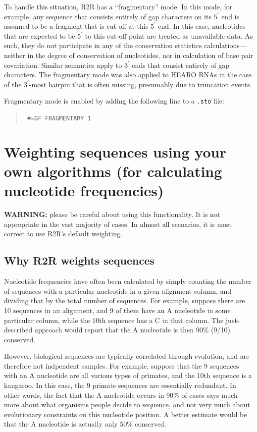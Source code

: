 \documentclass[letterpaper,12pt]{report}
\newcommand{\example}[1]{
\begin{quote}
{\raggedright
#1
}
\end{quote}
}
\newcommand{\examplett}[1]{
\example{{\tt #1}}
}
\begin{document}
To handle this situation, R2R has a ``fragmentary'' mode.
In this mode, for example, any sequence that consists entirely of gap characters on its $5^\prime$ end is assumed
to be a fragment that is cut off at this $5^\prime$ end.  In this case, nucleotides that are expected to 
be $5^\prime$ to this cut-off point are treated as unavailable data.  As such, they do not participate
in any of the conservation statistics calculations---neither in the degree of conservation of nucleotides, nor in calculation of base pair covariation.
Similar semantics apply to $3^\prime$ ends that consist entirely of gap characters.
The fragmentary mode was also applied to HEARO RNAs \cite{CoolRNAs} in the case of the $3^\prime$-most hairpin
that is often missing, presumably due to truncation events.

Fragmentary mode is enabled by adding the following line to a {\tt .sto} file:
\examplett{
\#=GF FRAGMENTARY 1
}

\section{Weighting sequences using your own algorithms (for calculating nucleotide frequencies)}
\label{manualweighting}

{\bf WARNING:} please be careful about using this functionality.  It is not appropriate in the vast majority of cases.  In almost all scenarios, it is most correct to use R2R's default weighting.

\subsection{Why R2R weights sequences}
\label{whyweights}

Nucleotide frequencies have often been calculated by simply counting the number of sequences with a particular nucleotide in a given alignment column, and dividing that by the total number of sequences.  For example, suppose there are 10 sequences in an alignment, and 9 of them have an A nucleotide in some particular column, while the 10th sequence has a C in that column.  The just-described approach would report that the A nucleotide is then 90\% (9/10) conserved.

However, biological sequences are typically correlated through evolution, and are therefore not indpendent samples.  For example, suppose that the 9 sequences with an A nucleotide are all various types of primates, and the 10th sequence is a kangaroo.  In this case, the 9 primate sequences are essentially redundant.  In other words, the fact that the A nucleotide occurs in 90\% of cases says much more about what organisms people decide to sequence, and not very much about evolutionary constraints on this nucleotide position. A better estimate would be that the A nucleotide is actually only 50\% conserved.
\end{document}
